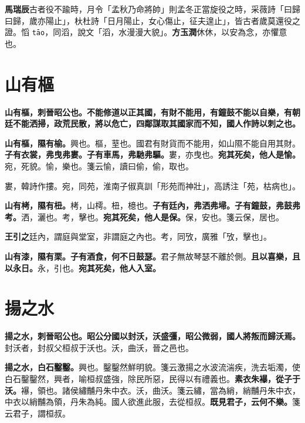 \begin{quoting}\textbf{馬瑞辰}古者役不踰時，月令「孟秋乃命將帥」則孟冬正當旋役之時，采薇詩「曰歸曰歸，歲亦陽止」，杕杜詩「日月陽止，女心傷止，征夫遑止」，皆古者歲莫還役之證。慆 \texttt{tāo}，同滔，說文「滔，水漫漫大貌」。\textbf{方玉潤}休休，以安為念，亦懼意也。\end{quoting}

\section{山有樞}


\textbf{山有樞，刺晉昭公也。不能修道以正其國，有財不能用，有鐘鼓不能以自樂，有朝廷不能洒掃，政荒民散，將以危亡，四鄰謀取其國家而不知，國人作詩以刺之也。}

\textbf{山有樞，隰有榆。}{\footnotesize 興也。樞，荎也。國君有財貨而不能用，如山隰不能自用其財。}\textbf{子有衣裳，弗曳弗婁。子有車馬，弗馳弗驅。}{\footnotesize 婁，亦曳也。}\textbf{宛其死矣，他人是愉。}{\footnotesize 宛，死貌。愉，樂也。箋云愉，讀曰偷，偷，取也。}

\begin{quoting}婁，韓詩作摟。宛，同苑，淮南子俶真訓「形苑而神壯」，高誘注「苑，枯病也」。\end{quoting}

\textbf{山有栲，隰有杻。}{\footnotesize 栲，山樗。杻，檍也。}\textbf{子有廷內，弗洒弗埽。子有鐘鼓，弗鼓弗考。}{\footnotesize 洒，灑也。考，擊也。}\textbf{宛其死矣，他人是保。}{\footnotesize 保，安也。箋云保，居也。}

\begin{quoting}\textbf{王引之}廷內，謂庭與堂室，非謂庭之內也。考，同攷，廣雅「攷，擊也」。\end{quoting}

\textbf{山有漆，隰有栗。子有酒食，何不日鼓瑟。}{\footnotesize 君子無故琴瑟不離於側。}\textbf{且以喜樂，且以永日。}{\footnotesize 永，引也。}\textbf{宛其死矣，他人入室。}

\section{揚之水}


\textbf{揚之水，刺晉昭公也。昭公分國以封沃，沃盛彊，昭公微弱，國人將叛而歸沃焉。}{\footnotesize 封沃者，封叔父桓叔于沃也。沃，曲沃，晉之邑也。}

\textbf{揚之水，白石鑿鑿。}{\footnotesize 興也。鑿鑿然鮮明貌。箋云激揚之水波流湍疾，洗去垢濁，使白石鑿鑿然，興者，喻桓叔盛強，除民所惡，民得以有禮義也。}\textbf{素衣朱襮，從子于沃。}{\footnotesize 襮，領也。諸侯繡黼丹朱中衣。沃，曲沃。箋云繡，當為綃，綃黼丹朱中衣，中衣以綃黼為領，丹朱為純。國人欲進此服，去從桓叔。}\textbf{既見君子，云何不樂。}{\footnotesize 箋云君子，謂桓叔。}


